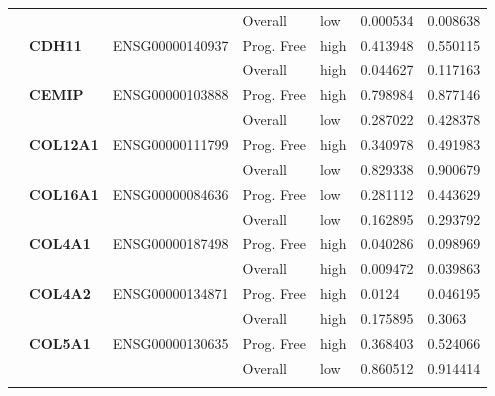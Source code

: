 \begin{spacing}{1}
{\begin{longtable}{|>{\bfseries}p{2cm}|>{\bfseries}p{1.9cm}|p{2.8cm}|p{2cm}|p{2cm}|p{1.5cm}|p{1.5cm}|}
             &          &                 & Overall    & low  & 0.000534 & 0.008638                \\
            \hhline{~======}
             & CDH11    & ENSG00000140937 & Prog. Free & high & 0.413948 & 0.550115                \\
            \hhline{~~~----}
             &          &                 & Overall    & high & 0.044627 & 0.117163                \\
            \hhline{~======}
             & CEMIP    & ENSG00000103888 & Prog. Free & high & 0.798984 & 0.877146                \\
            \hhline{~~~----}
             &          &                 & Overall    & low  & 0.287022 & 0.428378                \\
            \hhline{~======}
             & COL12A1  & ENSG00000111799 & Prog. Free & high & 0.340978 & 0.491983                \\
            \hhline{~~~----}
             &          &                 & Overall    & low  & 0.829338 & 0.900679                \\
            \hhline{~======}
             & COL16A1  & ENSG00000084636 & Prog. Free & low  & 0.281112 & 0.443629                \\
            \hhline{~~~----}
             &          &                 & Overall    & low  & 0.162895 & 0.293792                \\
            \hhline{~======}
             & COL4A1   & ENSG00000187498 & Prog. Free & high & 0.040286 & 0.098969                \\
            \hhline{~~~----}
             &          &                 & Overall    & high & 0.009472 & 0.039863                \\
            \hhline{~======}
             & COL4A2   & ENSG00000134871 & Prog. Free & high & 0.0124   & 0.046195                \\
            \hhline{~~~----}
             &          &                 & Overall    & high & 0.175895 & 0.3063                  \\
            \hhline{~======}
             & COL5A1   & ENSG00000130635 & Prog. Free & high & 0.368403 & 0.524066                \\
            \hhline{~~~----}
             &          &                 & Overall    & low  & 0.860512 & 0.914414                \\
            \hhline{~======}

\end{longtable}}
\end{spacing}
